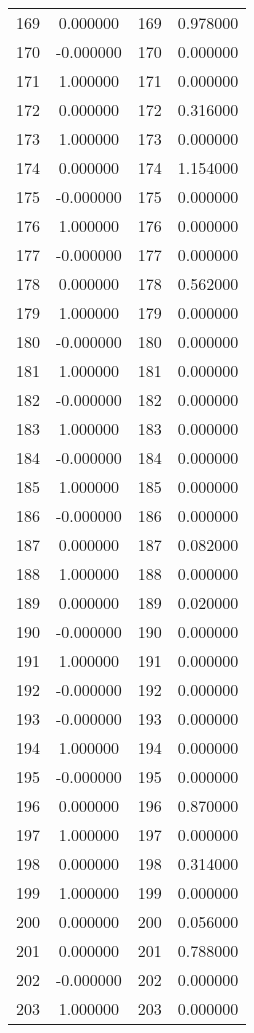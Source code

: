 \documentclass[12pt]{article}
\begin{document}
\begin{longtable}{@{}cccc@{}}
169 & 0.000000 & 169 & 0.978000 \\
170 & -0.000000 & 170 & 0.000000 \\
171 & 1.000000 & 171 & 0.000000 \\
172 & 0.000000 & 172 & 0.316000 \\
173 & 1.000000 & 173 & 0.000000 \\
174 & 0.000000 & 174 & 1.154000 \\
175 & -0.000000 & 175 & 0.000000 \\
176 & 1.000000 & 176 & 0.000000 \\
177 & -0.000000 & 177 & 0.000000 \\
178 & 0.000000 & 178 & 0.562000 \\
179 & 1.000000 & 179 & 0.000000 \\
180 & -0.000000 & 180 & 0.000000 \\
181 & 1.000000 & 181 & 0.000000 \\
182 & -0.000000 & 182 & 0.000000 \\
183 & 1.000000 & 183 & 0.000000 \\
184 & -0.000000 & 184 & 0.000000 \\
185 & 1.000000 & 185 & 0.000000 \\
186 & -0.000000 & 186 & 0.000000 \\
187 & 0.000000 & 187 & 0.082000 \\
188 & 1.000000 & 188 & 0.000000 \\
189 & 0.000000 & 189 & 0.020000 \\
190 & -0.000000 & 190 & 0.000000 \\
191 & 1.000000 & 191 & 0.000000 \\
192 & -0.000000 & 192 & 0.000000 \\
193 & -0.000000 & 193 & 0.000000 \\
194 & 1.000000 & 194 & 0.000000 \\
195 & -0.000000 & 195 & 0.000000 \\
196 & 0.000000 & 196 & 0.870000 \\
197 & 1.000000 & 197 & 0.000000 \\
198 & 0.000000 & 198 & 0.314000 \\
199 & 1.000000 & 199 & 0.000000 \\
200 & 0.000000 & 200 & 0.056000 \\
201 & 0.000000 & 201 & 0.788000 \\
202 & -0.000000 & 202 & 0.000000 \\
203 & 1.000000 & 203 & 0.000000 \\

\end{longtable}
\end{document}
